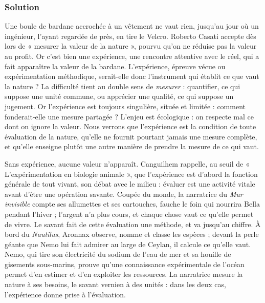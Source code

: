 \documentclass[11pt,a4paper]{article}
\begin{document}
\hypertarget{solution-5}{%
\subsubsection{Solution}\label{solution-5}}

Une boule de bardane accrochée à un vêtement ne vaut rien, jusqu'au jour où un ingénieur, l'ayant regardée de près, en tire le Velcro. Roberto Casati accepte dès lors de « mesurer la valeur de la nature », pourvu qu'on ne réduise pas la valeur au profit. Or c'est bien une expérience, une rencontre attentive avec le réel, qui a fait apparaître la valeur de la bardane. L'expérience, épreuve vécue ou expérimentation méthodique, serait-elle donc l'instrument qui établit ce que vaut la nature ? La difficulté tient au double sens de \emph{mesurer} : quantifier, ce qui suppose une unité commune, ou apprécier une qualité, ce qui suppose un jugement. Or l'expérience est toujours singulière, située et limitée : comment fonderait-elle une mesure partagée ? L'enjeu est écologique : on respecte mal ce dont on ignore la valeur. Nous verrons que l'expérience est la condition de toute évaluation de la nature, qu'elle ne fournit pourtant jamais une mesure complète, et qu'elle enseigne plutôt une autre manière de prendre la mesure de ce qui vaut.

Sans expérience, aucune valeur n'apparaît. Canguilhem rappelle, au seuil de « L'expérimentation en biologie animale », que l'expérience est d'abord la fonction générale de tout vivant, son débat avec le milieu : évaluer est une activité vitale avant d'être une opération savante. Coupée du monde, la narratrice du \emph{Mur invisible} compte ses allumettes et ses cartouches, fauche le foin qui nourrira Bella pendant l'hiver ; l'argent n'a plus cours, et chaque chose vaut ce qu'elle permet de vivre. Le savant fait de cette évaluation une méthode, et va jusqu'au chiffre. À bord du \emph{Nautilus}, Aronnax observe, nomme et classe les espèces ; devant la perle géante que Nemo lui fait admirer au large de Ceylan, il calcule ce qu'elle vaut. Nemo, qui tire son électricité du sodium de l'eau de mer et sa houille de gisements sous-marins, prouve qu'une connaissance expérimentale de l'océan permet d'en estimer et d'en exploiter les ressources. La narratrice mesure la nature à ses besoins, le savant vernien à des unités : dans les deux cas, l'expérience donne prise à l'évaluation.
\end{document}
